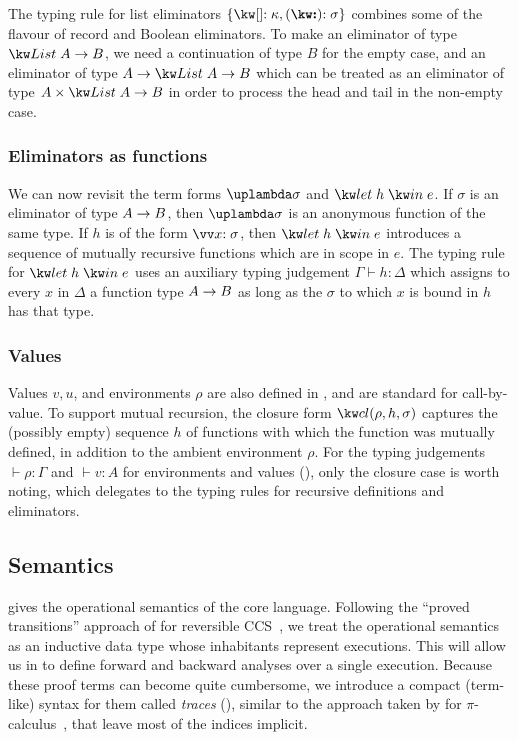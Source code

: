 The typing rule for list eliminators $\elimList{\kappa}{\sigma}$ combines some of the flavour of record and Boolean eliminators. To make an eliminator of type $\tyFun{\tyList{A}}{B}$, we need a continuation of type $B$ for the empty case, and an eliminator of type $\tyFun{A}{\tyFun{\tyList{A}}{B}}$ which can be treated as an eliminator of type $\tyFun{\tyProd{A}{\tyList{A}}}{B}$ in order to process the head and tail in the non-empty case.

\subsubsection{Eliminators as functions}

We can now revisit the term forms $\exLambda{\sigma}$ and $\exLetRecMutual{h}{e}$. If $\sigma$ is an eliminator of type ${A}\rightarrow{B}$, then $\exLambda{\sigma}$ is an anonymous function of the same type. If $h$ is of the form $\vec{\bind{x}{\sigma}}$, then $\exLetRecMutual{h}{e}$ introduces a sequence of mutually recursive functions which are in scope in $e$. The typing rule for $\exLetRecMutual{h}{e}$ uses an auxiliary typing judgement $\Gamma \vdash h : \Delta$ which assigns to every $x$ in $\Delta$ a function type ${A}\rightarrow{B}$ as long as the $\sigma$ to which $x$ is bound in $h$ has that type.

\subsubsection{Values}
Values $v, u$, and environments $\rho$ are also defined in , and are standard for call-by-value. To support mutual recursion, the closure form $\exClosure{\rho}{h}{\sigma}$ captures the (possibly empty) sequence $h$ of functions with which the function was mutually defined, in addition to the ambient environment $\rho$. For the typing judgements $\vdash \rho: \Gamma$ and $\vdash v: A$ for environments and values (), only the closure case is worth noting, which delegates to the typing rules for recursive definitions and eliminators.

\subsection{Semantics}

 gives the operational semantics of the core language. Following the ``proved transitions'' approach of \citeauthor{boudol89} for reversible CCS~\cite{boudol89}, we treat the operational semantics as an inductive data type whose inhabitants represent executions. This will allow us in  to define forward and backward analyses over a single execution. Because these proof terms can become quite cumbersome, we introduce a compact (term-like) syntax for them called \emph{traces} (), similar to the approach taken by \citeauthor{perera16d} for $\pi$-calculus~\cite{perera16d}, that leave most of the indices implicit.

